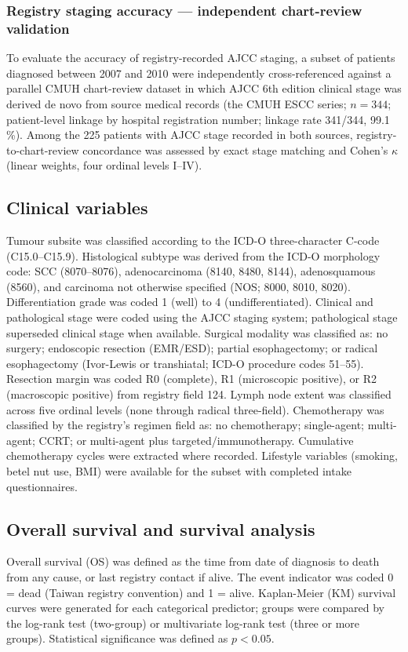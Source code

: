 \documentclass[12pt,a4paper]{article}
\begin{document}
\subsubsection*{Registry staging accuracy — independent chart-review validation}
\label{sec:dq}
To evaluate the accuracy of registry-recorded AJCC staging, a subset of
patients diagnosed between 2007 and 2010 were independently cross-referenced
against a parallel CMUH chart-review dataset in which AJCC 6th edition
clinical stage was derived de novo from source medical records (the CMUH
ESCC series; $n = 344$; patient-level linkage by hospital registration
number; linkage rate 341/344, 99.1\,\%). Among the 225 patients with AJCC
stage recorded in both sources, registry-to-chart-review concordance was
assessed by exact stage matching and Cohen's $\kappa$ (linear weights,
four ordinal levels I--IV).

\subsection{Clinical variables}
Tumour subsite was classified according to the ICD-O three-character
C-code (C15.0--C15.9). Histological subtype was derived from the
ICD-O morphology code: SCC (8070--8076), adenocarcinoma (8140, 8480,
8144), adenosquamous (8560), and carcinoma not otherwise specified (NOS;
8000, 8010, 8020). Differentiation grade was coded 1 (well) to 4
(undifferentiated). Clinical and pathological stage were coded using the
AJCC staging system; pathological stage superseded clinical stage when
available. Surgical modality was classified as: no surgery; endoscopic
resection (EMR/ESD); partial esophagectomy; or radical esophagectomy
(Ivor-Lewis or transhiatal; ICD-O procedure codes 51--55). Resection
margin was coded R0 (complete), R1 (microscopic positive), or R2
(macroscopic positive) from registry field 124. Lymph node extent was
classified across five ordinal levels (none through radical three-field).
Chemotherapy was classified by the registry's regimen field as: no
chemotherapy; single-agent; multi-agent; CCRT; or multi-agent plus
targeted/immunotherapy. Cumulative chemotherapy cycles were extracted
where recorded. Lifestyle variables (smoking, betel nut use, BMI) were
available for the subset with completed intake questionnaires.

\subsection{Overall survival and survival analysis}
Overall survival (OS) was defined as the time from date of diagnosis to
death from any cause, or last registry contact if alive. The event
indicator was coded 0 = dead (Taiwan registry convention) and 1 = alive.
Kaplan-Meier (KM) survival curves were generated for each categorical
predictor; groups were compared by the log-rank test (two-group) or
multivariate log-rank test (three or more groups). Statistical significance
was defined as $p < 0.05$.
\end{document}

